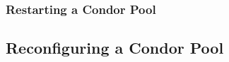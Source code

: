 \subsubsection{\label{sec:Pool-Restart}Restarting a Condor Pool}


\subsection{\label{sec:Reconfigure-Pool}Reconfiguring a Condor Pool}

%



